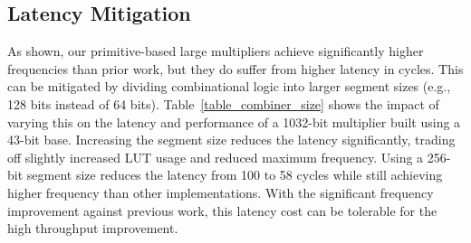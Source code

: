 \documentclass[sigconf,9pt,review]{acmart}
\begin{document}

\subsection{Latency Mitigation}
As shown, our primitive-based large multipliers achieve significantly higher frequencies than prior work, but they do suffer from higher latency in cycles.
This can be mitigated by dividing combinational logic into larger segment sizes (e.g., 128 bits instead of 64 bits).
Table~\ref{table_combiner_size} shows the impact of varying this on the latency and performance of a 1032-bit multiplier built using a 43-bit base.
Increasing the segment size reduces the latency significantly, trading off slightly increased LUT usage and reduced maximum frequency.
Using a 256-bit segment size reduces the latency from 100 to 58 cycles while still achieving higher frequency than other implementations.
With the significant frequency improvement against previous work, this latency cost can be tolerable for the high throughput improvement.



\begin{table}[t]
\footnotesize
\centering
\caption{Impact of combinational logic segment size on latency and performance for 1032-bit multiplier 4-Karatsuba with 43-bit base}
\label{table_combiner_size}
\end{table}




\end{document}
